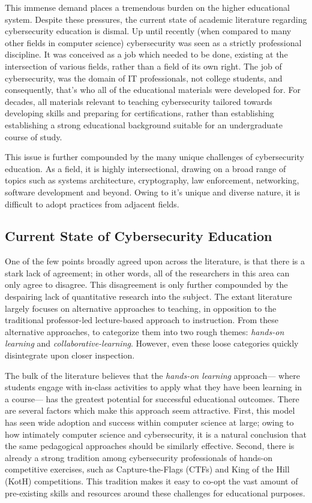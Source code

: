 \documentclass{article}
\begin{document}
    This immense demand places a tremendous burden on the higher educational system.
    Despite these pressures, the current state of academic literature regarding cybersecurity education is dismal. 
    Up until recently (when compared to many other fields in computer science) cybersecurity was seen as a strictly professional discipline. 
    It was conceived as a job which needed to be done, existing at the intersection of various fields, rather than a field of its own right.
    The job of cybersecurity, was the domain of IT professionals, not college students, and consequently, that's who all of the educational materials were developed for. 
    For decades, all materials relevant to teaching cybersecurity tailored towards developing skills and preparing for certifications, rather than establishing establishing a strong educational background suitable for an undergraduate course of study. 
    
        This issue is further compounded by the many unique challenges of cybersecurity education. 
    As a  field, it is highly intersectional, drawing on a broad range of topics such as systems architecture, cryptography, law enforcement, networking, software development and beyond. 
    Owing to it's unique and diverse nature, it is difficult to adopt practices from adjacent fields. 

    \subsection{Current State of Cybersecurity Education} 
    One of the few points broadly agreed upon across the literature, is that there is a stark lack of agreement; 
    in other words, all of the researchers in this area can only agree to disagree.
    This disagreement is only further compounded by the despairing lack of quantitative research into the subject. 
    The extant literature largely focuses on alternative approaches to teaching, in opposition to the traditional professor-led lecture-based approach to instruction.
    From these alternative approaches, to categorize them into two rough themes: \emph{hands-on learning} and \emph{collaborative-learning}. 
    However, even these loose categories quickly disintegrate upon closer inspection. 

    The bulk of the literature believes that the \emph{hands-on learning} approach---
    where students engage with in-class activities to apply what they have been learning in a course---
    has the greatest potential for successful educational outcomes. 
    There are several factors which make this approach seem attractive.
    First, this model has seen wide adoption and success within computer science at large; 
    owing to how intimately computer science and cybersecurity, it is a natural conclusion that the same pedagogical approaches should be similarly effective. 
    Second, there is already a strong tradition among cybersecurity professionals of hands-on competitive exercises, such as Capture-the-Flags (CTFs) and King of the Hill (KotH) competitions. 
    This tradition makes it easy to co-opt the vast amount of pre-existing skills and resources around these challenges for educational purposes. 
\end{document}
